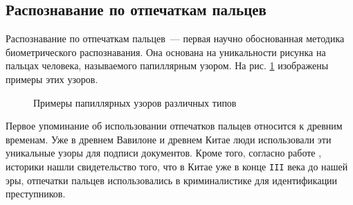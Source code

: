 \documentclass[14pt, a4paper]{extarticle}
\begin{document}
\subsection{Распознавание по отпечаткам пальцев}
Распознавание по отпечаткам пальцев~--- первая научно обоснованная методика биометрического распознавания. Она основана на уникальности рисунка на пальцах человека, называемого папиллярным узором. На рис. \ref{img:fingerprints} изображены примеры этих узоров.

\begin{center}
	\begin{figure}[h!]
		\centering
		\hspace{0.05\textwidth}
		\hspace{0.05\textwidth}
		\caption{Примеры папиллярных узоров различных типов}
		\label{img:fingerprints}
	\end{figure}
\end{center}

\vspace{-1cm}

Первое упоминание об использовании отпечатков пальцев относится к древним временам. Уже в древнем Вавилоне и древнем Китае люди использовали эти уникальные узоры для подписи документов. Кроме того, согласно работе \cite{xiang1988historical}, историки нашли свидетельство того, что в Китае уже в конце \texttt{III} века до нашей эры, отпечатки пальцев использовались в криминалистике для идентификации преступников. 
\end{document}
